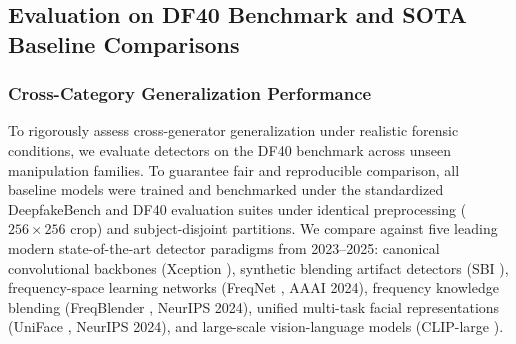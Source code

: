 \subsection{Evaluation on DF40 Benchmark and SOTA Baseline Comparisons}

\subsubsection{Cross-Category Generalization Performance}
To rigorously assess cross-generator generalization under realistic forensic conditions, we evaluate detectors on the DF40 benchmark \citep{Yan2024DF40} across unseen manipulation families. To guarantee fair and reproducible comparison, all baseline models were trained and benchmarked under the standardized DeepfakeBench \citep{Yan2023DeepfakeBench} and DF40 \citep{Yan2024DF40} evaluation suites under identical preprocessing ($256 \times 256$ crop) and subject-disjoint partitions. We compare against five leading modern state-of-the-art detector paradigms from 2023--2025: canonical convolutional backbones (Xception \citep{Chollet2017CVPR, Yan2023DeepfakeBench}), synthetic blending artifact detectors (SBI \citep{Shiohara2022SBI, Yan2024DF40}), frequency-space learning networks (FreqNet \citep{Chen2024FreqNet}, AAAI 2024), frequency knowledge blending (FreqBlender \citep{Huang2024FreqBlender}, NeurIPS 2024), unified multi-task facial representations (UniFace \citep{Yan2024DF40}, NeurIPS 2024), and large-scale vision-language models (CLIP-large \citep{Radford2021CLIP, Yan2024DF40}).

